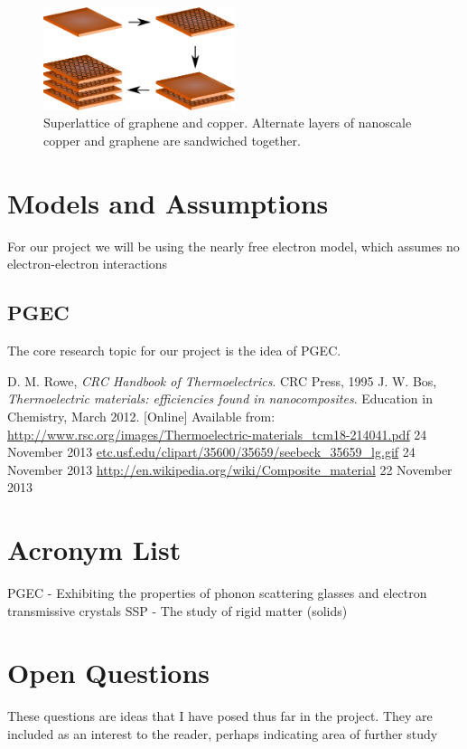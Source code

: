 \documentclass[a4paper,10pt,journal]{IEEEtran}
\begin{document}
\begin{figure}
	\centering
	\includegraphics[width=0.5\textwidth]{graphene-superlattice.eps}
	\caption{Superlattice of graphene and copper. Alternate layers of
	nanoscale copper and graphene are sandwiched together.}
\end{figure}

\section{Models and Assumptions}
For our project we will be using the nearly free electron model, which
assumes no electron-electron interactions

\subsection{\acf{PGEC}}
The core research topic for our project is the idea of PGEC.


\begin{thebibliography}{2}
D. M. Rowe, \emph{CRC Handbook of Thermoelectrics}. CRC Press, 1995
J. W. Bos, \emph{Thermoelectric materials: efficiencies found in
nanocomposites}. Education in Chemistry, March 2012. [Online] Available
from:
\url{http://www.rsc.org/images/Thermoelectric-materials_tcm18-214041.pdf} 24 November 2013
\url{etc.usf.edu/clipart/35600/35659/seebeck_35659_lg.gif} 24 November
2013
\url{http://en.wikipedia.org/wiki/Composite_material} 22 November 2013
\end{thebibliography}

\newpage
\appendix
\section{Acronym List}
\acresetall
\ac{PGEC} - Exhibiting the properties of phonon scattering glasses and
electron transmissive crystals
\ac{SSP} - The study of rigid matter (solids)

\section{Open Questions}
These questions are ideas that I have posed thus far in the project.
They are included as an interest to the reader, perhaps indicating
area of further study
\end{document}
